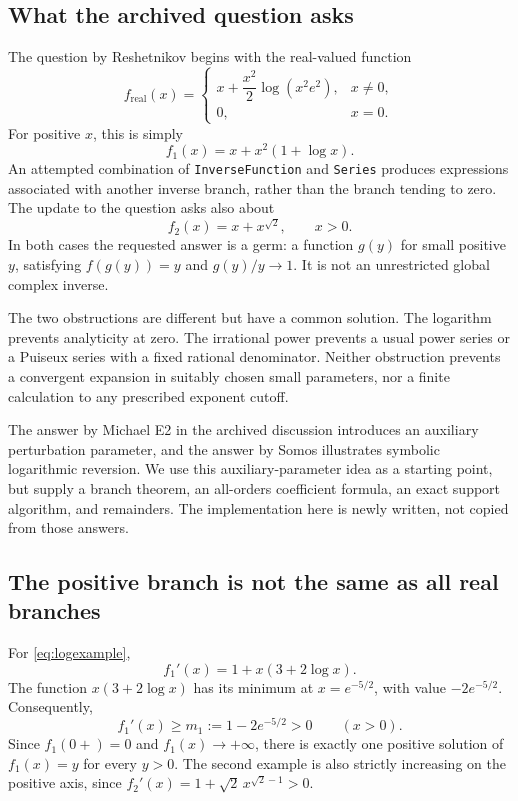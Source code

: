 \documentclass[11pt,a4paper]{article}
\theoremstyle{definition}
\begin{document}
\subsection{What the archived question asks}
The question by Reshetnikov \cite{question} begins with the real-valued function
\begin{equation}\label{eq:original}
 f_{\mathrm{real}}(x)=
 \begin{cases}
 x+\dfrac{x^2}{2}\log(x^2e^2),&x\ne0,\\
 0,&x=0.
 \end{cases}
\end{equation}
For positive \(x\), this is simply
\begin{equation}\label{eq:logexample}
 f_1(x)=x+x^2(1+\log x).
\end{equation}
An attempted combination of \texttt{InverseFunction} and \texttt{Series}
produces expressions associated with another inverse branch, rather than the
branch tending to zero. The update to the question asks also about
\begin{equation}\label{eq:irrationalexample}
 f_2(x)=x+x^{\sqrt2},\qquad x>0.
\end{equation}
In both cases the requested answer is a germ: a function \(g(y)\) for small
positive \(y\), satisfying \(f(g(y))=y\) and \(g(y)/y\to1\).
It is not an unrestricted global complex inverse.

The two obstructions are different but have a common solution. The logarithm
prevents analyticity at zero. The irrational power prevents a usual power
series or a Puiseux series with a fixed rational denominator. Neither
obstruction prevents a convergent expansion in suitably chosen small
parameters, nor a finite calculation to any prescribed exponent cutoff.

The answer by Michael E2 in the archived discussion introduces an auxiliary
perturbation parameter, and the answer by Somos illustrates symbolic
logarithmic reversion. We use this auxiliary-parameter idea as a starting
point, but supply a branch theorem, an all-orders coefficient formula,
an exact support algorithm, and remainders. The implementation here is newly
written, not copied from those answers.

\subsection{The positive branch is not the same as all real branches}
For \eqref{eq:logexample},
\[
 f_1'(x)=1+x(3+2\log x).
\]
The function \(x(3+2\log x)\) has its minimum at \(x=e^{-5/2}\), with value
\(-2e^{-5/2}\). Consequently,
\begin{equation}\label{eq:slopeglobal}
 f_1'(x)\ge m_1:=1-2e^{-5/2}>0\qquad(x>0).
\end{equation}
Since \(f_1(0+)=0\) and \(f_1(x)\to+\infty\), there is exactly one positive
solution of \(f_1(x)=y\) for every \(y>0\). The second example is also strictly
increasing on the positive axis, since
\(f_2'(x)=1+\sqrt2\,x^{\sqrt2-1}>0\).
\end{document}
